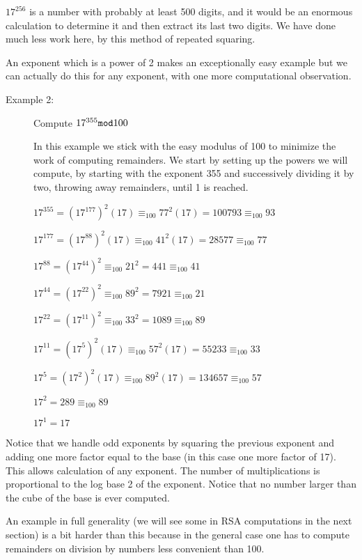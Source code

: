 \documentclass[12pt]{article}
\begin{document}
$17^{256}$ is a number with probably at least 500 digits, and it would be an enormous calculation to determine it and then extract its last two digits.  We have done much less work here, by this method
of repeated squaring.


An exponent which is a power of 2 makes an exceptionally easy example but we can actually do this for any exponent, with one more computational observation.


\begin{description}

\item[Example 2:]  Compute $17^{355}{\tt mod}100$

In this example we stick with the easy modulus of 100 to minimize the work of computing remainders.  We start by setting up the powers we will compute, by
starting with the exponent 355 and successively dividing it by two, throwing away remainders, until 1 is reached.

$17^{355} = (17^{177})^2(17) \equiv_{100} 77^2(17) = 100793 \equiv_{100} 93$

$17^{177} = (17^{88})^2(17) \equiv_{100} 41^2(17) = 28577 \equiv_{100} 77$

$17^{88} = (17^{44})^2 \equiv_{100} 21^2 = 441 \equiv_{100} 41$

$17^{44} = (17^{22})^2 \equiv_{100} 89^2 = 7921 \equiv_{100} 21$

$17^{22} = (17^{11})^2 \equiv_{100} 33^2 = 1089 \equiv_{100} 89$

$17^{11} = (17^5)^2(17) \equiv_{100} 57^2(17) = 55233 \equiv_{100} 33$

$17^5 = (17^2)^2(17) \equiv_{100} 89^2(17) = 134657 \equiv_{100} 57$

$17^2  = 289 \equiv_{100} 89$

$17^1 = 17$



\end{description}

Notice that we handle odd exponents by squaring the previous exponent and adding one more factor equal to the base (in this case one more factor of 17).  This allows calculation
of any exponent.  The number of multiplications is proportional to the log base 2 of the exponent.  Notice that no number larger than the cube of the base is ever computed.

An example in full generality (we will see some in RSA computations in the next section)  is a bit harder than this because in the general case one has to compute remainders
on division by numbers less convenient than 100.
\end{document}

